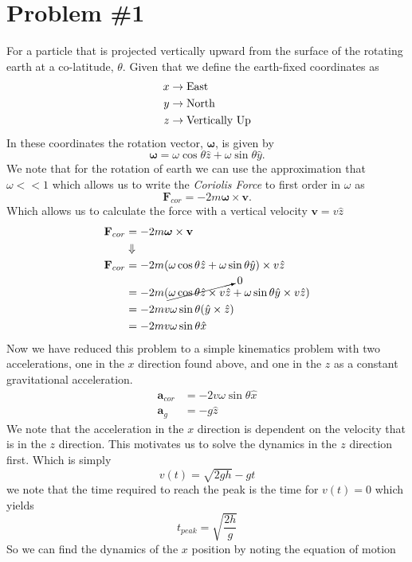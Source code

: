 \documentclass[11pt]{article}
\numberwithin{equation}{section}
\begin{document}


\section{Problem \#1}
For a particle that is projected vertically upward from the surface of the rotating earth at
a co-latitude, $\theta$. Given that we define the earth-fixed coordinates as
\begin{align*}
x&\rightarrow\textnormal{East}\\
y&\rightarrow\textnormal{North}\\
z&\rightarrow\textnormal{Vertically Up}
\end{align*}
In these coordinates the rotation vector, $\mathbf{\omega}$, is given by
$$\pmb{\omega} = \omega\cos\theta\hat{z}+\omega\sin\theta\hat{y}.$$
We note that for the rotation of earth we can use the approximation that $\omega<<1$ which 
allows us to write the \emph{Coriolis Force} to first order in $\omega$ as
$$\mathbf{F}_{cor} = -2m\pmb{\omega}\times\mathbf{v}.$$
Which allows us to calculate the force with a vertical velocity $\mathbf{v} = v\hat{z}$
\begin{align*}
\mathbf{F}_{cor} &= -2m\boldsymbol{\omega}\times\mathbf{v}\\
&\Downarrow\\
\mathbf{F}_{cor} &= -2m(\omega\cos\theta\hat{z}+\omega\sin\theta\hat{y})\times v\hat{z}\\
&= -2m(\cancelto{0}{\omega\cos\theta\hat{z}\times v\hat{z}}+\omega\sin\theta\hat{y}\times v\hat{z})\\
&= -2mv\omega\sin\theta(\hat{y}\times\hat{z})\\
&= -2mv\omega\sin\theta\hat{x}
\end{align*}
Now we have reduced this problem to a simple kinematics problem with two accelerations, one 
in the $x$ direction found above, and one in the $z$ as a constant gravitational acceleration. 
\begin{align*}
\mathbf{a}_{cor} &= -2v\omega\sin\theta\hat{x}\\
\mathbf{a}_{g} &= -g\hat{z}
\end{align*}
We note that the acceleration in the $x$ direction is dependent on the velocity that is in 
the $z$ direction. This motivates us to solve the dynamics in the $z$ direction first. Which
is simply
$$v(t) = \sqrt{2gh} - gt$$
we note that the time required to reach the peak is the time for $v(t)=0$ which yields 
$$t_{peak} = \sqrt{\frac{2h}{g}}$$
So we can find the dynamics of the $x$ position by noting the equation of motion
\end{document}
